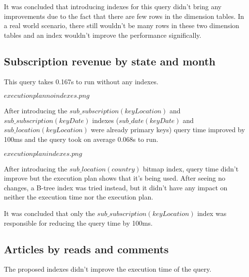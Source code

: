It was concluded that introducing indexes for this query didn't bring any improvements due to the fact that there are few rows in the dimension tables. In a real world scenario, there still wouldn't be many rows in these two dimension tables and an index wouldn't improve the performance significally.

\subsection*{Subscription revenue by state and month} 
This query takes 0.167s to run without any indexes.

$execution plan no indexes.png$

After introducing the $sub\_subscription(keyLocation)$ and $sub\_subscription(keyDate)$ indexes ($sub\_date(keyDate)$ and $sub\_location(keyLocation)$ were already primary keys) query time improved by 100ms and the query took on average 0.068s to run.

$execution plan indexes.png$

After introducing the $sub\_location(country)$ bitmap index, query time didn't improve but the execution plan shows that it's being used. After seeing no changes, a B-tree index was tried instead, but it didn't have any impact on neither the execution time nor the execution plan.

It was concluded that only the $sub\_subscription(keyLocation)$ index was responsible for reducing the query time by 100ms.

\subsection*{Articles by reads and comments}

The proposed indexes didn't improve the execution time of the query.